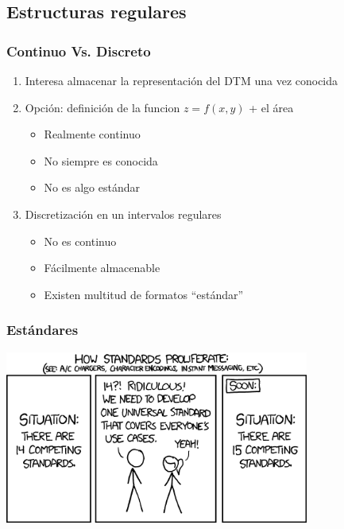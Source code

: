 \subsection[Ráster]{Estructuras regulares}
\begin{frame}
  \frametitle{Continuo Vs. Discreto}
  \begin{enumerate}
    \item Interesa almacenar la representación del DTM una vez conocida
    \item Opción: definición de la funcion $z = f(x,y)$ + el área
      \begin{itemize}
        \item[\tickYes] Realmente continuo
        \item[\tickNo] No siempre es conocida
        \item[\tickNo] No es algo estándar
      \end{itemize}
    \item Discretización en un intervalos regulares
      \begin{itemize}
        \item[\tickNo] No es continuo
        \item[\tickYes] Fácilmente almacenable
        \item[\tickYes] Existen multitud de formatos ``estándar''
      \end{itemize}
  \end{enumerate}
\end{frame}
\begin{frame}
  \frametitle{Estándares}
    \begin{center}
      \includegraphics[width=0.75\textwidth]{images/standards}
    \end{center}
\end{frame}
